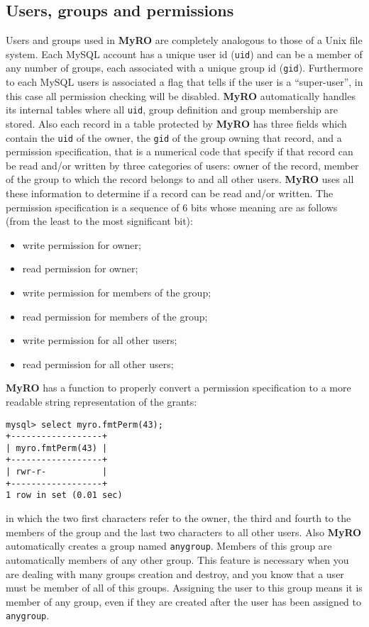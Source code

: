 \documentclass[12pt,titlepage]{article}
\newcommand{\myro}{\textbf{MyRO} }
\begin{document}
\subsection{Users, groups and permissions}
Users and groups used in \myro are completely analogous to those of a
Unix file system. Each MySQL account has a unique user id (\verb|uid|)
and can be a member of any number of groups, each associated with a
unique group id (\verb|gid|). Furthermore to each MySQL users is
associated a flag that tells if the user is a ``super-user'', in this
case all permission checking will be disabled. \myro automatically
handles its internal tables where all \verb|uid|, group definition
and group membership are stored. Also each record in a table protected
by \myro has three fields which contain the \verb|uid| of the owner,
the \verb|gid| of the group owning that record, and a permission
specification, that is a numerical code that specify if that record
can be read and/or written by three categories of users: owner of the
record, member of the group to which the record belongs to and all
other users. \myro uses all these information to determine if a
record can be read and/or written. The permission specification is a
sequence of 6 bits whose meaning are as follows (from the least
to the most significant bit):
%
\begin{itemize}
\item write permission for owner;
\item read permission for owner;
\item write permission for members of the group;
\item read permission for members of the group;
\item write permission for all other users;
\item read permission for all other users;
\end{itemize}

\myro has a function to properly convert a permission specification to
a more readable string representation of the grants:
%
\begin{verbatim}
mysql> select myro.fmtPerm(43);
+------------------+
| myro.fmtPerm(43) |
+------------------+
| rwr-r-           | 
+------------------+
1 row in set (0.01 sec)
\end{verbatim}
%
in which the two first characters refer to the owner, the third and
fourth to the members of the group and the last two characters to all
other users. Also \myro automatically creates a group named
\verb|anygroup|. Members of this group are automatically members of
any other group. This feature is necessary when you are dealing with
many groups creation and destroy, and you know that a user must be
member of all of this groups. Assigning the user to this group means
it is member of any group, even if they are created after the user has
been assigned to \verb|anygroup|.
\end{document}
